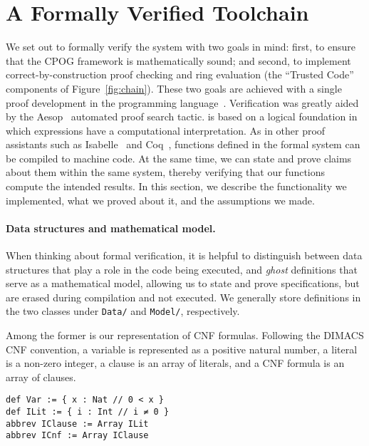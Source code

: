 
\section{A Formally Verified Toolchain}
\label{sect:formally-verified-toolchain}
\label{sect:lean:subtle-condition}

We set out to formally verify the system with two goals in mind:
first, to ensure that the CPOG framework is mathematically sound;
and second, to implement correct-by-construction proof checking
and ring evaluation (the ``Trusted Code'' components of Figure~\ref{fig:chain}).
These two goals are achieved with a single proof development
in the \lean{} programming language~\cite{demoura:cade:2021}.
Verification was greatly aided
by the Aesop~\cite{23limperg_aesop_white_box_best_first_proof_search_lean}
automated proof search tactic.
\lean{} is based on a logical foundation
in which expressions have a computational interpretation.
As in other proof assistants such as Isabelle~\cite{nipkow:et:al:02} and Coq~\cite{coq},
functions defined in the formal system
can be compiled to machine code.
At the same time,
we can state and prove claims about them within the same system,
thereby verifying that our functions compute the intended results.
In this section,
we describe the functionality we implemented,
what we proved about it,
and the assumptions we made.

\paragraph{Data structures and mathematical model.}
When thinking about formal verification,
it is helpful to distinguish between data structures
that play a role in the code being executed,
and \emph{ghost} definitions that serve as a mathematical model,
allowing us to state and prove specifications,
but are erased during compilation and not executed.
We generally store definitions in the two classes
under {\tt Data/} and {\tt Model/},
respectively.

Among the former is our representation of CNF formulas.
Following the DIMACS CNF convention,
a variable is represented as a positive natural number,
a literal is a non-zero integer,
a clause is an array of literals,
and a CNF formula is an array of clauses.
\begin{lstlisting}
def Var := { x : Nat // 0 < x }
def ILit := { i : Int // i ≠ 0 }
abbrev IClause := Array ILit
abbrev ICnf := Array IClause
\end{lstlisting}

